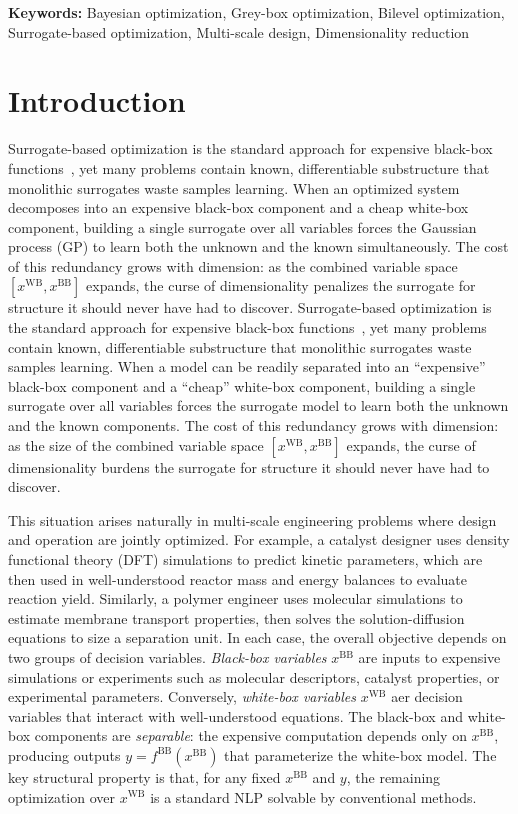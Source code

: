 \documentclass[12pt,a4paper]{article}%
\theoremstyle{plain}%
\theoremstyle{remark}%
\theoremstyle{definition}%
\def\WB{\mathrm{WB}}
\def\BB{\mathrm{BB}}
\begin{document}
\noindent\textbf{Keywords:} Bayesian optimization, Grey-box optimization, Bilevel optimization, Surrogate-based optimization, Multi-scale design, Dimensionality reduction

\section{Introduction}\label{sec:introduction}

Surrogate-based optimization is the standard approach for expensive black-box functions~\cite{frazier2018tutorial}, yet many problems contain known, differentiable substructure that monolithic surrogates waste samples learning. When an optimized system decomposes into an expensive black-box component and a cheap white-box component, building a single surrogate over all variables forces the Gaussian process (GP) to learn both the unknown and the known simultaneously. The cost of this redundancy grows with dimension: as the combined variable space $[x^{\WB}, x^{\BB}]$ expands, the curse of dimensionality penalizes the surrogate for structure it should never have had to discover.
Surrogate-based optimization is the standard approach for expensive black-box functions~\cite{frazier2018tutorial}, yet many problems contain known, differentiable substructure that monolithic surrogates waste samples learning. When a model can be readily separated into an ``expensive'' black-box component and a ``cheap'' white-box component, building a single surrogate over all variables forces the surrogate model to learn both the unknown and the known components. The cost of this redundancy grows with dimension: as the size of the combined variable space $[x^{\WB}, x^{\BB}]$ expands, the curse of dimensionality burdens the surrogate for structure it should never have had to discover.

This situation arises naturally in multi-scale engineering problems where design and operation are jointly optimized. For example, a catalyst designer uses density functional theory (DFT) simulations to predict kinetic parameters, which are then used in well-understood reactor mass and energy balances to evaluate reaction yield. Similarly, a polymer engineer uses molecular simulations to estimate membrane transport properties, then solves the solution-diffusion equations to size a separation unit. In each case, the overall objective depends on two groups of decision variables. \emph{Black-box variables} $x^{\BB}$ are inputs to expensive simulations or experiments such as molecular descriptors, catalyst properties, or experimental parameters. Conversely, \emph{white-box variables} $x^{\WB}$ aer decision variables that interact with well-understood equations. The black-box and white-box components are \emph{separable}: the expensive computation depends only on $x^{\BB}$, producing outputs $y = f^{\BB}(x^{\BB})$ that parameterize the white-box model. The key structural property is that, for any fixed $x^{\BB}$ and $y$, the remaining optimization over $x^{\WB}$ is a standard NLP solvable by conventional methods.
\end{document}
